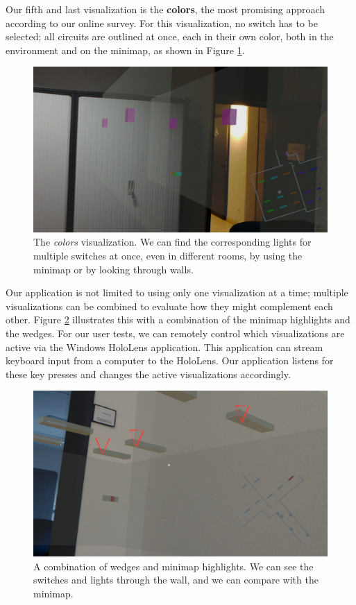 Our fifth and last visualization is the \textbf{colors}, the most promising approach according to our online survey. For this visualization, no switch has to be selected; all circuits are outlined at once, each in their own color, both in the environment and on the minimap, as shown in Figure \ref{fig:colors_vis}.

\begin{figure}
    \centering
    \includegraphics[width=1.0\linewidth]{resources/implementation/colors.jpg}
    \caption{The \textit{colors} visualization. We can find the corresponding lights for multiple switches at once, even in different rooms, by using the minimap or by looking through walls.}
    \label{fig:colors_vis}
\end{figure}

Our application is not limited to using only one visualization at a time; multiple visualizations can be combined to evaluate how they might complement each other. Figure \ref{fig:combo_vis} illustrates this with a combination of the minimap highlights and the wedges. For our user tests, we can remotely control which visualizations are active via the Windows HoloLens application. This application can stream keyboard input from a computer to the HoloLens. Our application listens for these key presses and changes the active visualizations accordingly.

\begin{figure}
    \centering
    \includegraphics[width=1.0\linewidth]{resources/implementation/combo.jpg}
    \caption{A combination of wedges and minimap highlights. We can see the switches and lights through the wall, and we can compare with the minimap.}
    \label{fig:combo_vis}
\end{figure}

